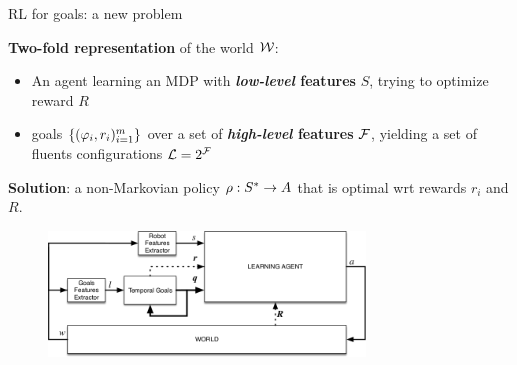 \documentclass{beamer}
\begin{document}
\begin{frame}{RL for \LLf goals: a new problem}
	
		\textbf{Two-fold representation} of the world $\mathcal{W}$:
		\begin{itemize}
			\item An agent learning an MDP with \textbf{\emph{low-level} features} $S$, trying to optimize reward $R$
			\item \LLf goals $\{(\varphi_i, r_i)_{i=1}^m\}$ over a set of \textbf{\emph{high-level} features} $\mathcal{F}$, yielding a set of fluents configurations $\mathcal{L} = 2^{\mathcal{F}}$
		\end{itemize}
		
		\textbf{Solution}: a non-Markovian policy $\rho: S^*\to A$ that is optimal wrt rewards $r_i$ and $R$.
		
		\begin{figure}
			\includegraphics[width=0.75\textwidth]{images/rl-two-representations-no-borders}
		\end{figure}
		
			
\end{frame}
\end{document}
